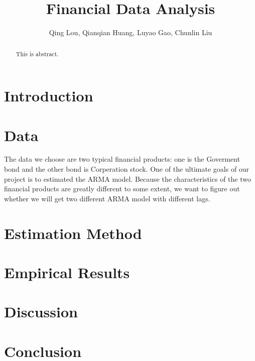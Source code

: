 \documentclass[12pt,letterpaper]{article}
\begin{document}
\title{\textbf{\Large Financial Data Analysis}}
\author{Qing Lou, Qianqian Huang, Luyao Gao, Chunlin Liu}
\date{}
\maketiitle 


\begin{abstract}
This is abstract.
\end{abstract}


\section{Introduction}

\section{Data}
         The data we choose are two typical financial products: one is the Goverment bond and 
         the other bond is Corperation stock. One of the ultimate goals of our project is to 
         estimated the ARMA model. Because the characteristics of the two financial products 
         are greatly different to some extent, we want to figure out whether we will get two 
         different ARMA model with different lags.

\section{Estimation Method}

\section{Empirical Results}

\section{Discussion}

\section{Conclusion}
\end{document}
